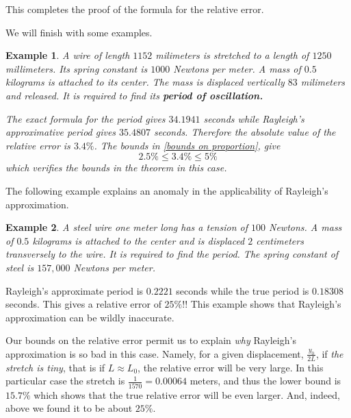 \documentclass[12pt]{article}
\makeatletter
\newtheorem{ex}{Example}
\numberwithin{equation}{section}
\def\section{\@startsection{section}{1}{\z@}{-3.5ex plus -1ex minus
			  -.2ex}{2.3ex plus .2ex}{\large\bf}}
\renewcommand{\leq}{\leqslant}  %
\makeatother
\begin{document}
This completes the proof of the formula for the relative error.


\section{Examples}



We will finish with some examples.

\begin{ex}
A wire of length $1152$ milimeters is stretched to a length of $1250$ millimeters.  Its spring constant is $1000$  Newtons per meter.  A mass of $0.5$ kilograms is attached to its center.  The mass is displaced vertically $83$ milimeters and released.  It is required to find its \textbf{period of oscillation.}

\emph{The exact formula for the period gives $34.1941$ seconds while Rayleigh's approximative period gives $35.4807$ seconds.  Therefore the absolute value of the relative error is $3.4\%$.  The bounds in \eqref{bounds on proportion}, give
$$
2.5\%\leq 3.4\%\leq 5\%
$$
which verifies the bounds in the theorem in this case.}
\end{ex}

The following example explains an anomaly in the applicability of Rayleigh's approximation.

\begin{ex}
A steel wire one meter long has a tension of $100$ Newtons.  A mass of $0.5$ kilograms is attached to the center and is displaced $2$ centimeters transversely to the wire.  It is required to find the period.  The spring constant of steel is $157,000$ Newtons per meter.
\end{ex}

Rayleigh's approximate period is $0.2221$ seconds while the true period is $0.18308$ seconds.  This gives a relative error of $25\%$!!  This example shows that Rayleigh's approximation can be wildly inaccurate.

Our bounds on the relative error permit us to explain \emph{why} Rayleigh's approximation is so bad in this case.
Namely, for a given displacement, $\frac{y_0}{2L}$,  if \emph{the stretch is tiny}, that is if $L\approx L_0$, the relative error will be very large.  In this particular case the stretch is $\frac{1}{1570}=0.00064$ meters, and thus the lower bound is $15.7\%$ which shows that the true relative error will be even larger.  And, indeed, above we found it to be about $25\%$.
\end{document}
